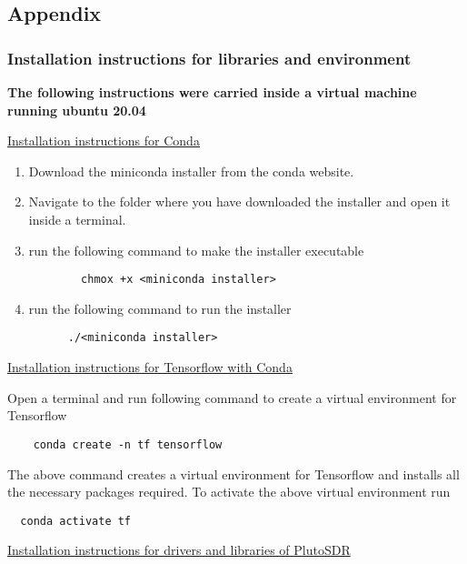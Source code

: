 \begin{appendices}
  \chapter{Appendix}%
  \vspace{-1cm}
  \subsection{Installation instructions for libraries and environment}
  \noindent \textbf{The following instructions were carried inside a virtual machine running ubuntu 20.04}

  \noindent \underline{ Installation instructions for Conda }
  \begin{enumerate}
    \item Download the miniconda installer from the conda website.
    \item Navigate to the folder where you have downloaded the installer and open it inside a terminal.
    \item run the following command to make the installer executable
      \begin{verbatim}
        chmox +x <miniconda installer>
      \end{verbatim}
    \item run the following command to run the installer
      \begin{verbatim}
      ./<miniconda installer>
      \end{verbatim}
  \end{enumerate}

  \noindent \underline{Installation instructions for Tensorflow with Conda }

  \noindent Open a terminal and run following command to create a virtual environment for Tensorflow
  \begin{verbatim}
    conda create -n tf tensorflow
  \end{verbatim}
  \noindent The above command creates a virtual environment for Tensorflow and installs all the necessary packages required.
  \noindent To activate the above virtual environment run
  \begin{verbatim}
  conda activate tf
  \end{verbatim}

  \newpage
  \noindent \underline{Installation instructions for drivers and libraries of PlutoSDR}


\end{appendices}
